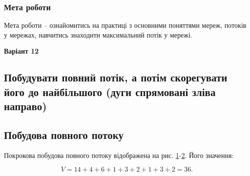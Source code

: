 \documentclass[14pt]{extreport}
\begin{document}
\pagestyle{empty}



\subsubsection*{Мета роботи}

Мета роботи – ознайомитись на практиці з основними поняттями
мереж, потоків у мережах, навчитись знаходити максимальний потік у
мережі.

\begin{center}\bf Варіант 12\end{center}

\subsection*{Побудувати повний потік,
а потім скорегувати його до найбільшого
(дуги спрямовані зліва направо)}
\begin{figure}[h]
	
\end{figure}

\subsection*{Побудова повного потоку}

Покрокова побудова
повного потоку
відображена на
рис. \ref{startfull}-\ref{endfull}.
Його значення:

$$V=14+4+6+1+3+2+1+3+2=36.$$

%	
%
%	
%
%	
%
%	
%
%	
%
%	
%
%	
%
%	
%
%	

\begin{figure}[h]
	\centering
	
	\caption{}
	\label{startfull}
\end{figure}
\begin{figure}[h]
	\centering
	
	\caption{}
\end{figure}
\begin{figure}[h]
	\centering
	
	\caption{}
\end{figure}
\begin{figure}[h]
	\centering
	
	\caption{}
\end{figure}
\begin{figure}[h]
	\centering
	
	\caption{}
\end{figure}
\begin{figure}[h]
	\centering
	
	\caption{}
\end{figure}
\begin{figure}[h]
	\centering
	
	\caption{}
\end{figure}
\begin{figure}[h]
	\centering
	
	\caption{}
\end{figure}
\begin{figure}[h]
	\centering
	
	\caption{}
	\label{endfull}
\end{figure}
\end{document}
